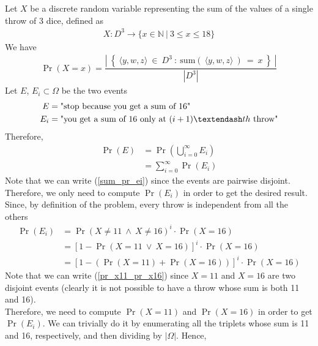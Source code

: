 Let $X$ be a discrete random variable representing the sum of the values of a single throw of 3 dice, defined as
\begin{align*}
	X: D^3 \rightarrow \{ x \in \mathbb{N} \ | \ 3 \leq x \leq 18 \}
\end{align*}
We have
\begin{align}
	\Pr(X = x) = \dfrac{\left | \ \left \{ \ \langle y,w,z \rangle \ \in \ D^3 \ : \ \mathrm{sum}(\ \langle y,w,z \rangle \ ) \ = \ x \ \right \} \ \right |}{\left | D^3 \right |} \label{triplet}
\end{align}
Let $E$, $E_i \subset \Omega$ be the two events
\begin{align*}
	E &= \text{"stop because you get a sum of 16"}\\
	E_i &= \text{"you get a sum of 16 only at $(i+1) \textendash th$ throw"}
\end{align*}
Therefore,
\begin{align}
	\Pr(E) &= \Pr\left(\bigcup_{i = 0}^{\infty} E_i \right) \nonumber\\
	&= \sum_{i = 0}^{\infty}\Pr(E_i) \label{sum_pr_ei}
\end{align}
Note that we can write (\ref{sum_pr_ei}) since the events are pairwise disjoint.\\
Therefore, we only need to compute $\Pr(E_i)$ in order to get the desired result. Since, by definition of the problem, every throw is independent from all the others
\begin{align}
	\Pr(E_i) &= \Pr( X \ne 11 \ \land \ X \ne 16 )^i \cdot \Pr(X = 16) \nonumber\\
	&= [1 - \Pr( X = 11 \ \lor \ X = 16)]^i \cdot \Pr(X = 16) \nonumber\\
	&= [1 - (\Pr(X = 11) + \Pr( X = 16))]^i \cdot \Pr(X = 16) \label{pr_x11_pr_x16}
\end{align}
Note that we can write (\ref{pr_x11_pr_x16}) since $X = 11$ and $X = 16$ are two disjoint events (clearly it is not possible to have a throw whose sum is both 11 and 16).\\
Therefore, we need to compute $\Pr(X = 11)$ and $\Pr( X = 16)$ in order to get $\Pr(E_i)$. We can trivially do it by enumerating all the triplets whose sum is 11 and 16, respectively, and then dividing by $|\Omega|$. Hence,

